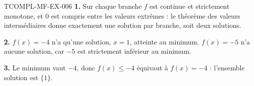 \begin{corrige}{TCOMPL-MF-EX-006}
\textbf{1.} Sur chaque branche $f$ est continue et strictement monotone, et
$0$ est compris entre les valeurs extrêmes : le théorème des valeurs
intermédiaires donne exactement une solution par branche, soit deux
solutions.

\textbf{2.} $f(x)=-4$ n'a qu'une solution, $x=1$, atteinte au minimum.
$f(x)=-5$ n'a aucune solution, car $-5$ est strictement inférieur au minimum.

\textbf{3.} Le minimum vaut $-4$, donc $f(x)\leq-4$ équivaut à $f(x)=-4$ :
l'ensemble solution est $\{1\}$.
\end{corrige}

